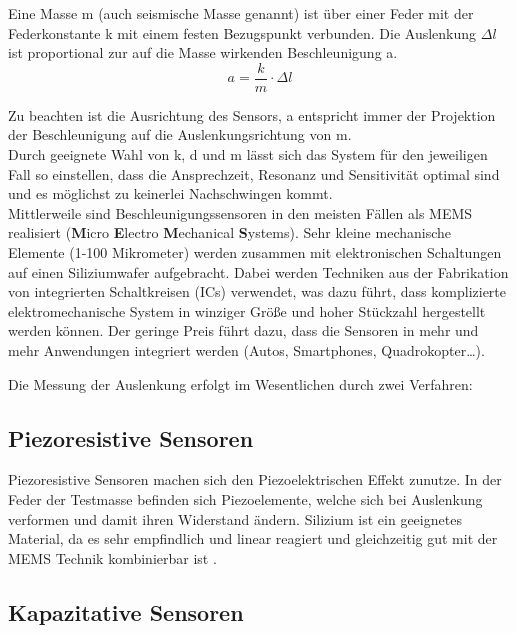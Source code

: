 \documentclass[12pt,a4paper]{scrartcl}
\begin{document}
Eine Masse m (auch seismische Masse genannt) ist über einer Feder mit der Federkonstante k mit einem festen Bezugspunkt verbunden. Die Auslenkung $\Delta l$ ist proportional zur auf die Masse wirkenden Beschleunigung a.
\begin{equation}
a = \frac{k}{m} \cdot \Delta l
\end{equation}

Zu beachten ist die Ausrichtung des Sensors, a entspricht immer der Projektion der Beschleunigung auf die Auslenkungsrichtung von m.\\
Durch geeignete Wahl von k, d und m lässt sich das System für den jeweiligen Fall so einstellen, dass die Ansprechzeit, Resonanz und Sensitivität optimal sind und es möglichst zu keinerlei Nachschwingen kommt. \\

Mittlerweile sind Beschleunigungssensoren in den meisten Fällen als MEMS realisiert (\textbf{M}icro \textbf{E}lectro \textbf{M}echanical \textbf{S}ystems). Sehr kleine mechanische Elemente (1-100 Mikrometer) werden zusammen mit elektronischen Schaltungen auf einen Siliziumwafer aufgebracht. Dabei werden Techniken aus der Fabrikation von integrierten Schaltkreisen (ICs) verwendet, was dazu führt, dass komplizierte elektromechanische System in winziger Größe und hoher Stückzahl hergestellt werden können. Der geringe Preis führt dazu, dass die Sensoren in mehr und mehr Anwendungen integriert werden (Autos, Smartphones, Quadrokopter…).

Die Messung der Auslenkung erfolgt im Wesentlichen durch zwei Verfahren:

\subsection{Piezoresistive Sensoren}
Piezoresistive Sensoren machen sich den Piezoelektrischen Effekt zunutze. In der Feder der Testmasse befinden sich Piezoelemente, welche sich bei Auslenkung verformen und damit ihren Widerstand ändern. Silizium ist ein geeignetes Material, da es sehr empfindlich und linear reagiert und gleichzeitig gut mit der MEMS Technik kombinierbar ist \citep{Kanda:1991gf}.

\subsection{Kapazitative Sensoren}
\end{document}
